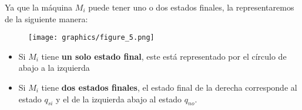 \begin{frame}
  \PN Ya que la máquina $M_{i}$ puede tener uno o dos estados finales, la representaremos de la siguiente manera:
  \begin{figure}[h]
    \centering
    \texttt{[image: graphics/figure\_5.png]}
  \end{figure}
  \begin{itemize}
    \item Si $M_{i}$ tiene \textbf{un solo estado final}, este está representado por el círculo de abajo a la izquierda
    \item Si $M_{i}$ tiene \textbf{dos estados finales}, el estado final de la derecha corresponde al estado $q_{si}$ y
      el de la izquierda abajo al estado $q_{no}$.
  \end{itemize}
\end{frame}
